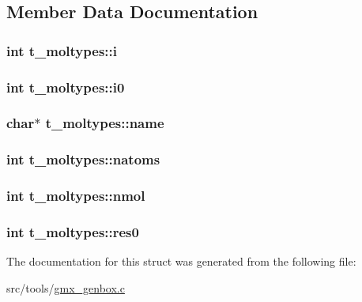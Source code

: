 \subsection{\-Member \-Data \-Documentation}
\hypertarget{structt__moltypes_ae9f124fb3dda77162bc0eac11e2c735c}{
\subsubsection[{i}]{\setlength{\rightskip}{0pt plus 5cm}int {\bf t\-\_\-moltypes\-::i}}}\label{structt__moltypes_ae9f124fb3dda77162bc0eac11e2c735c}
\hypertarget{structt__moltypes_a87a6cdb182d1f95ad2fd5cedf96ab0c5}{
\subsubsection[{i0}]{\setlength{\rightskip}{0pt plus 5cm}int {\bf t\-\_\-moltypes\-::i0}}}\label{structt__moltypes_a87a6cdb182d1f95ad2fd5cedf96ab0c5}
\hypertarget{structt__moltypes_a2201563de69f775a56da90c7ddd9c7f5}{
\subsubsection[{name}]{\setlength{\rightskip}{0pt plus 5cm}char$\ast$ {\bf t\-\_\-moltypes\-::name}}}\label{structt__moltypes_a2201563de69f775a56da90c7ddd9c7f5}
\hypertarget{structt__moltypes_a8d4de5dc7d2aa442e68f4660df0aaf39}{
\subsubsection[{natoms}]{\setlength{\rightskip}{0pt plus 5cm}int {\bf t\-\_\-moltypes\-::natoms}}}\label{structt__moltypes_a8d4de5dc7d2aa442e68f4660df0aaf39}
\hypertarget{structt__moltypes_ad48c2c1d17b1e7541d7a7c3fe93a9f12}{
\subsubsection[{nmol}]{\setlength{\rightskip}{0pt plus 5cm}int {\bf t\-\_\-moltypes\-::nmol}}}\label{structt__moltypes_ad48c2c1d17b1e7541d7a7c3fe93a9f12}
\hypertarget{structt__moltypes_ac2028c177f761d4b3404edc74ab497d2}{
\subsubsection[{res0}]{\setlength{\rightskip}{0pt plus 5cm}int {\bf t\-\_\-moltypes\-::res0}}}\label{structt__moltypes_ac2028c177f761d4b3404edc74ab497d2}


\-The documentation for this struct was generated from the following file\-:\begin{DoxyCompactItemize}
\item 
src/tools/\hyperlink{gmx__genbox_8c}{gmx\-\_\-genbox.\-c}\end{DoxyCompactItemize}

